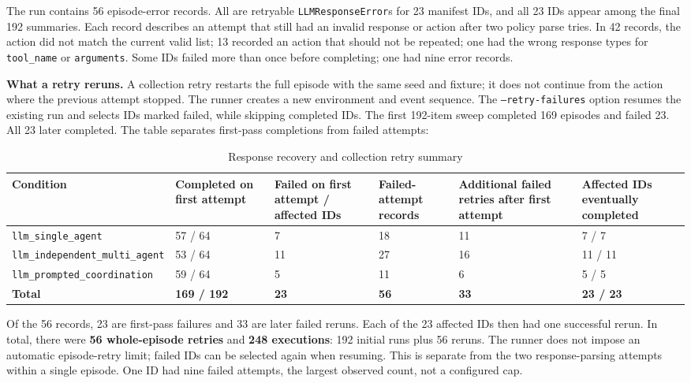 \documentclass[12pt,a4paper,oneside]{report}
\begin{document}
The run contains 56 episode-error records. All are retryable \texttt{LLMResponseError}s for 23 manifest IDs, and all 23 IDs appear among the final 192 summaries. Each record describes an attempt that still had an invalid response or action after two policy parse tries. In 42 records, the action did not match the current valid list; 13 recorded an action that should not be repeated; one had the wrong response types for \texttt{tool\allowbreak\_name} or \texttt{arguments}. Some IDs failed more than once before completing; one had nine error records.

\textbf{What a retry reruns.} A collection retry restarts the full episode with the same seed and fixture; it does not continue from the action where the previous attempt stopped. The runner creates a new environment and event sequence. The \texttt{--retry-failures} option resumes the existing run and selects IDs marked failed, while skipping completed IDs. The first 192-item sweep completed 169 episodes and failed 23. All 23 later completed. The table separates first-pass completions from failed attempts:

\begin{table}[htbp]
\centering
\small
\setlength{\tabcolsep}{4pt}
\begin{tabularx}{\linewidth}{|Y|Y|Y|Y|Y|Y|}
\hline
\textbf{Condition} & \textbf{Completed on first attempt} & \textbf{Failed on first attempt / affected IDs} & \textbf{Failed-attempt records} & \textbf{Additional failed retries after first attempt} & \textbf{Affected IDs eventually completed} \\
\hline
\texttt{llm\allowbreak\_single\allowbreak\_agent} & 57 / 64 & 7 & 18 & 11 & 7 / 7 \\
\hline
\texttt{llm\allowbreak\_independent\allowbreak\_multi\allowbreak\_agent} & 53 / 64 & 11 & 27 & 16 & 11 / 11 \\
\hline
\texttt{llm\allowbreak\_prompted\allowbreak\_coordination} & 59 / 64 & 5 & 11 & 6 & 5 / 5 \\
\hline
\textbf{Total} & \textbf{169 / 192} & \textbf{23} & \textbf{56} & \textbf{33} & \textbf{23 / 23} \\
\hline
\end{tabularx}
\caption{Response recovery and collection retry summary}
\end{table}
Of the 56 records, 23 are first-pass failures and 33 are later failed reruns. Each of the 23 affected IDs then had one successful rerun. In total, there were \textbf{56 whole-episode retries} and \textbf{248 executions}: 192 initial runs plus 56 reruns. The runner does not impose an automatic episode-retry limit; failed IDs can be selected again when resuming. This is separate from the two response-parsing attempts within a single episode. One ID had nine failed attempts, the largest observed count, not a configured cap.
\end{document}
